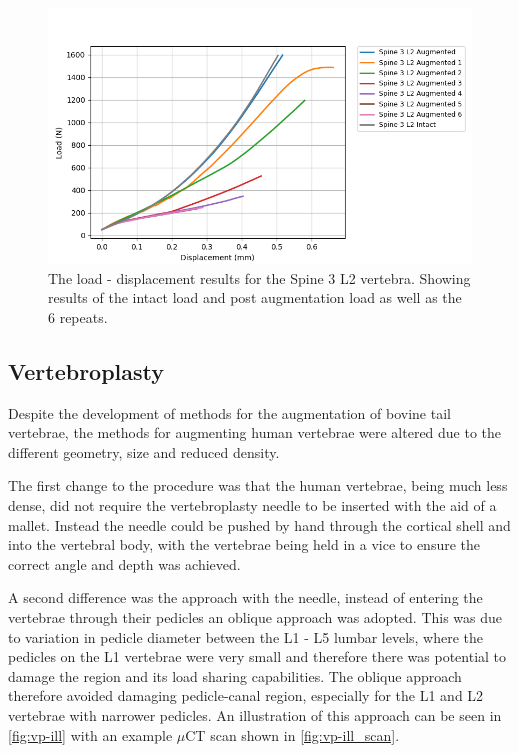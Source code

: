 \begin{figure}[ht!]
  \centering
  \includegraphics[width=\textwidth]{Chapters/Chapter_HT_images/spine3L2allrep.png}
  \caption{The load - displacement results for the Spine 3 L2 vertebra. Showing
    results of the intact load and post augmentation load as well as the 6
    repeats.}
  \label{fig:Spine3_L2}
\end{figure}





\subsection{Vertebroplasty}




Despite the development of methods for the augmentation of bovine tail
vertebrae, the methods for augmenting human vertebrae were altered due to the
different geometry, size and reduced density. 

The first change to the procedure was that the human vertebrae, being much less dense, did
not require the vertebroplasty needle to be inserted with the aid of a mallet.
Instead the needle could be pushed by hand through the cortical shell and into
the vertebral body, with the vertebrae being held in a vice to ensure the
correct angle and depth was achieved.

A second difference was the approach with the needle, instead of entering
the vertebrae through their pedicles an oblique approach was adopted. This was
due to variation in pedicle diameter between the L1 - L5 lumbar levels, where
the pedicles on the L1 vertebrae were very small and
therefore there was potential to damage the region and its load sharing capabilities.
The oblique approach therefore avoided damaging
pedicle-canal
region, especially for the L1 and L2 vertebrae with narrower pedicles.
An illustration of this approach can be seen in \cref{fig:vp-ill} with an
example $\mu$CT scan shown in \cref{fig:vp-ill_scan}.


